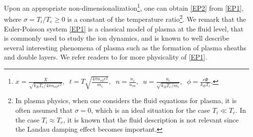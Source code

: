 \documentclass{amsart}
\numberwithin{equation}{section}
\theoremstyle{plain}%
\theoremstyle{definition}
\theoremstyle{remark}
\theoremstyle{remark}
\begin{document}
Upon an appropriate non-dimensionalization\footnote{$x= \frac{X}{\sqrt{k_BT_e/4\pi n_{e0}e^2}}, \;\; t = T\sqrt{ \frac{4\pi n_{e0}e^2}{m_i}}, \;\; n = \frac{n_i}{n_{e0}}, \;\; u = \frac{u_i}{\sqrt{k_BT_e/m_i}}, \;\; \phi = \frac{e\Phi}{k_BT_e}.$}, one can obtain \eqref{EP2} from \eqref{EP1}, where $\sigma = T_i/T_e\geq 0$  is a constant of the temperature ratio\footnote{In plasma physics, when one considers the fluid equations for plasma, it is often assumed that $\sigma=0$, which is an ideal situation for the  case $T_i \ll T_e$. In the case $T_i \approx T_e$, it is known that the fluid description is not relevant since the Landau damping effect becomes important.}.
We remark that the Euler-Poisson system \eqref{EP1} is a classical model of plasma at the fluid level, that is commonly used to study the ion dynamics, and is known to well describe several  interesting  phenomena of plasma  such as  the formation of plasma sheaths and double layers. We refer readers to \cite{Ch,Dav} for more physicality of \eqref{EP1}.
\end{document}
